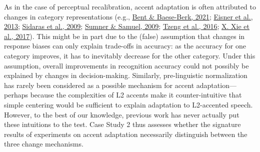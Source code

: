 \documentclass[
  11pt,
  english,
  man,floatsintext]{apa6}
\begin{document}
As in the case of perceptual recalibration, accent adaptation is often attributed to changes in category representations (e.g., \protect\hyperlink{ref-bent-baeseberk2021}{Bent \& Baese-Berk, 2021}; \protect\hyperlink{ref-eisner2013}{Eisner et al., 2013}; \protect\hyperlink{ref-sidaras2009}{Sidaras et al., 2009}; \protect\hyperlink{ref-sumner2009}{Sumner \& Samuel, 2009}; \protect\hyperlink{ref-tzeng2016}{Tzeng et al., 2016}; \protect\hyperlink{ref-xie2016jep}{X. Xie et al., 2017}). This might be in part due to the (false) assumption that changes in response biases can only explain trade-offs in accuracy: as the accuracy for one category improves, it has to inevitably decrease for the other category. Under this assumption, overall improvements in recognition accuracy could not possibly be explained by changes in decision-making. Similarly, pre-linguistic normalization has rarely been considered as a possible mechanism for accent adaptation---perhaps because the complexities of L2 accents make it counter-intuitive that simple centering would be sufficient to explain adaptation to L2-accented speech. However, to the best of our knowledge, previous work has never actually put these intuitions to the test. Case Study 2 thus assesses whether the signature results of experiments on accent adaptation necessarily distinguish between the three change mechanisms.
\end{document}
